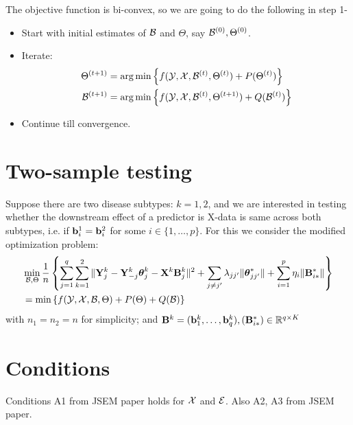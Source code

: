 \documentclass[fleqn,11pt]{article}
\DeclareMathOperator*{\argmin}{arg\,min}
\numberwithin{equation}{section}
\begin{document}
The objective function is bi-convex, so we are going to do the following in step 1-

\begin{itemize}
\item Start with initial estimates of ${\cal{B}}$ and $\Theta$, say ${\cal{B}}^{(0)}, \Theta^{(0)}$.
\item Iterate:
%
\begin{align}
\Theta^{(t+1)} &= \argmin \left\{ f ( \cY, \cX, \cB^{(t)}, \Theta^{(t)}) + P (\Theta^{(t)}) \right\}\\
\cB^{(t+1)} &= \argmin \left\{ f ( \cY, \cX, \cB^{(t)}, \Theta^{(t+1)}) + Q (\cB^{(t)}) \right\}
\end{align}
\item Continue till convergence.
\end{itemize}
%

\section{Two-sample testing}
Suppose there are two disease subtypes: $k = 1,2$, and we are interested in testing whether the downstream effect of a predictor is X-data is same across both subtypes, i.e. if ${\bf{b}}_i^1 = {\bf{b}}_i^2$ for some $i \in \{ 1, \ldots, p \}$. For this we consider the modified optimization problem:
%
\begin{align}
& \min_{{\cal{B}}, \Theta} \frac{1}{n} \left\{ \sum_{j=1}^q \sum_{k=1}^2 \| {\mathbf{Y}}_j^k - {\mathbf{Y}}_{-j}^k {\boldsymbol{\theta}}_j^k - {\mathbf{X}}^k {\mathbf{B}}_{j}^k \|^2 + \sum_{j \neq j'} \lambda_{jj'} \| {\boldsymbol{\theta}}_{jj'}^* \| + \sum_{i=1}^p \eta_i \| {\mathbf{B}}_{i*}^* \| \right\}\\
&= \min \left\{ f ( {\cal{Y}}, {\cal{X}}, {\cal{B}}, \Theta) + P (\Theta) + Q ({\cal{B}}) \right\} 
\end{align}
%
with $n_1 = n_2 = n$ for simplicity; and ${\mathbf{B}}^k = ({\bf{b}}_1^k, \ldots, {\bf{b}}_q^k), ({\mathbf{B}}_{i*}^*) \in {\mathbb{R}}^{ q \times K}$

\section{Conditions}
Conditions A1 from JSEM paper holds for ${\cal{X}}$ and ${\cal{E}}$. Also A2, A3 from JSEM paper.
\end{document}

